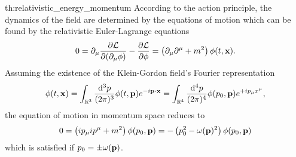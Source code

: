 \begin{delayedproof}{th:relativistic_energy_momentum}
	According to the action principle, the dynamics of the field are determined by the equations of motion which can be found by the relativistic Euler-Lagrange equations
	\begin{equation*}
		0
		=
		\partial_\mu\pdv{\mathcal{L}}{(\partial_\mu\phi)}
		-
		\pdv{\mathcal{L}}{\phi}
		=
		\left(
			\partial_\mu\partial^\mu
			+
			m^2
		\right)
		\phi(t,\vb{x})
		.
	\end{equation*}
	Assuming the existence of the Klein-Gordon field's Fourier representation~\cite[p.~341]{Cohen2019}
	\begin{equation}
		\phi(t,\vb{x})
		=
		\int_{\mathbb{R}^3}\frac{\dd[3]{p}}{(2\pi)^3}
		\phi(t,\vb{p})
		e^{-i\vb{p}\vdot\vb{x}}
		=
		\int_{\mathbb{R}^4}\frac{\dd[4]{p}}{(2\pi)^4}
		\phi(p_0,\vb{p})
		e^{+ip_\mu x^\mu}
		,
	\end{equation}
	the equation of motion in momentum space reduces to
	\begin{equation}
		0
		=
		\left(
			ip_\mu ip^\mu
			+
			m^2
		\right)
		\phi(p_0,\vb{p})
		=
		-
		\left(
			p_0^2
			-
			\omega(\vb{p})^2
		\right)
		\phi(p_0,\vb{p})
	\end{equation}
	which is satisfied if $p_0=\pm\omega(\vb{p})$.
\end{delayedproof}
